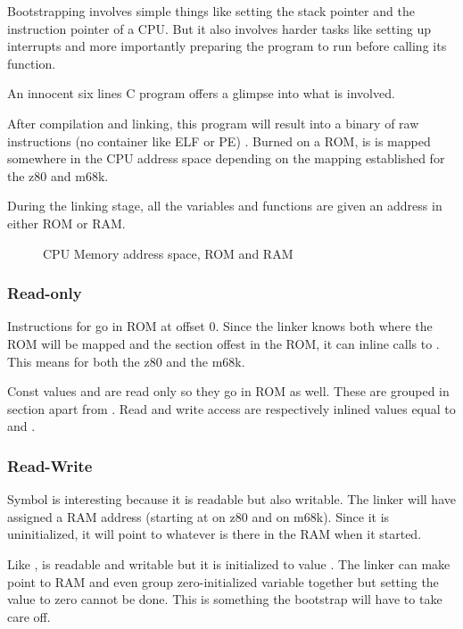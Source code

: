 Bootstrapping involves simple things like setting the stack pointer and the instruction pointer of a CPU. But it also involves harder tasks like setting up interrupts and more importantly preparing the program to run before calling its  function. 

An innocent six lines C program offers a glimpse into what is involved.



After compilation and linking, this program will result into a binary of raw instructions (no container like ELF or PE) . Burned on a ROM, is is mapped somewhere in the CPU address space depending on the mapping established for the z80 and m68k.

During the linking stage, all the variables and functions are given an address in either ROM or RAM. 

\begin{figure}[H]
\caption*{CPU Memory address space, ROM and RAM}
\end{figure}

\subsubsection{Read-only}
Instructions for  go in ROM at offset 0. Since the linker knows both where the ROM will be mapped and the section offest in the ROM, it can inline calls to . This means  for both the z80 and the m68k.

Const values  and  are read only so they go in ROM as well. These are grouped in section  apart from . Read and write access are respectively inlined values equal to  and .

\subsubsection{Read-Write}
Symbol  is interesting because it is readable but also writable. The linker will have assigned a RAM address (starting at  on z80 and  on m68k). Since it is uninitialized, it will point to whatever is there in the RAM when it started.

Like ,  is readable and writable but it is initialized to value . The linker can make  point to RAM and even group zero-initialized variable together but setting the value to zero cannot be done. This is something the bootstrap will have to take care off.

